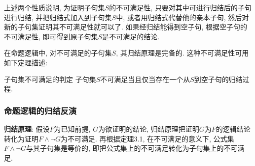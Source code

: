 上述两个性质说明, 为证明子句集$S$的不可满足性, 只要对其中可进行归结后的子句进行归结, 并把归结式加入到子句集$S$中, 或者用归结式代替他的亲本子句, 然后对新的子句集证明其不可满足性就可以了.
如果经归结能得到空子句, 根据空子句的不可满足性, 即可得到原子句集$S$是不可满足的结论.

在命题逻辑中, 对不可满足的子句集$S$, 其归结原理是完备的.
这种不可满足性可用如下定理描述:
\begin{mythm}{子句集不可满足的判定}{}\label{AIthm3.3}
    子句集$S$不可满足当且仅当存在一个从$S$到空子句的归结过程.
\end{mythm}
\subsubsection{命题逻辑的归结反演}

\textbf{归结原理}: 假设$F$为已知前提, $G$为欲证明的结论, 归结原理把证明$G$为$F$的逻辑结论转化为证明$F\wedge \neg G$为不可满足.
再根据定理3.1, 在不可满足的意义下, 公式集$F\wedge \neg G$与其子句集是等价的, 即把公式集上的不可满足转化为子句集上的不可满足.

